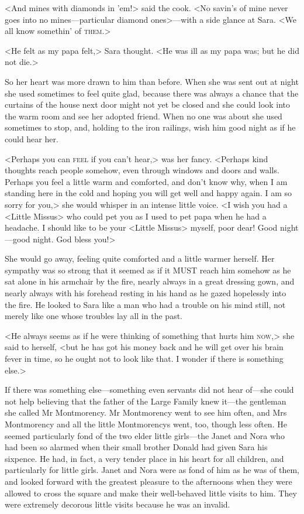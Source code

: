 <And mines with diamonds in 'em!> said the cook. <No savin's of mine never goes into no mines—particular diamond ones>—with a side glance at Sara. <We all know somethin' of \textsc{them}.>

<He felt as my papa felt,> Sara thought. <He was ill as my papa was; but he did not die.>

So her heart was more drawn to him than before. When she was sent out at night she used sometimes to feel quite glad, because there was always a chance that the curtains of the house next door might not yet be closed and she could look into the warm room and see her adopted friend. When no one was about she used sometimes to stop, and, holding to the iron railings, wish him good night as if he could hear her.

<Perhaps you can \textsc{feel} if you can't hear,> was her fancy. <Perhaps kind thoughts reach people somehow, even through windows and doors and walls. Perhaps you feel a little warm and comforted, and don't know why, when I am standing here in the cold and hoping you will get well and happy again. I am so sorry for you,> she would whisper in an intense little voice. <I wish you had a <Little Missus> who could pet you as I used to pet papa when he had a headache. I should like to be your <Little Missus> myself, poor dear! Good night—good night. God bless you!>

She would go away, feeling quite comforted and a little warmer herself. Her sympathy was so strong that it seemed as if it MUST reach him somehow as he sat alone in his armchair by the fire, nearly always in a great dressing gown, and nearly always with his forehead resting in his hand as he gazed hopelessly into the fire. He looked to Sara like a man who had a trouble on his mind still, not merely like one whose troubles lay all in the past.

<He always seems as if he were thinking of something that hurts him \textsc{now},> she said to herself, <but he has got his money back and he will get over his brain fever in time, so he ought not to look like that. I wonder if there is something else.>

If there was something else—something even servants did not hear of—she could not help believing that the father of the Large Family knew it—the gentleman she called Mr Montmorency. Mr Montmorency went to see him often, and Mrs Montmorency and all the little Montmorencys went, too, though less often. He seemed particularly fond of the two elder little girls—the Janet and Nora who had been so alarmed when their small brother Donald had given Sara his sixpence. He had, in fact, a very tender place in his heart for all children, and particularly for little girls. Janet and Nora were as fond of him as he was of them, and looked forward with the greatest pleasure to the afternoons when they were allowed to cross the square and make their well-behaved little visits to him. They were extremely decorous little visits because he was an invalid.

